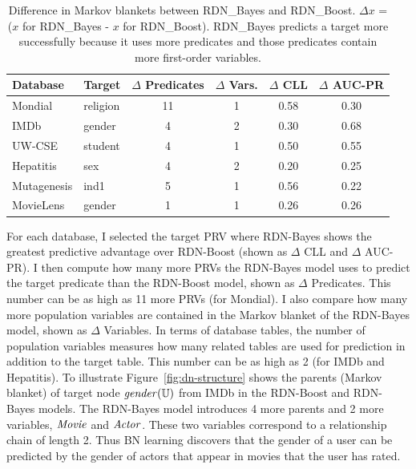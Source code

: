 \documentclass{sfuthesis}
\begin{document}
\begin{table}[!htbp]
 \addtolength{\tabcolsep}{5pt}
 \caption{Difference in Markov blankets between RDN\_Bayes and RDN\_Boost. $\Delta x$ = ($x$ for RDN\_Bayes - $x$ for RDN\_Boost).  RDN\_Bayes predicts a target more successfully because it uses more  predicates and those predicates contain more first-order variables.}
      \centering
\begin{tabular}{l l c c c c}
\hline
Database & Target & $\Delta$ Predicates  & $\Delta$ Vars. & $\Delta$ CLL & $\Delta$ AUC-PR \\\hline
Mondial & religion & 11 & 1 & 0.58 & 0.30\\
IMDb & gender & 4 & 2 & 0.30 & 0.68 \\
UW-CSE & student & 4 & 1 & 0.50 & 0.55 \\
Hepatitis & sex & 4 & 2 & 0.20 & 0.25\\
Mutagenesis & ind1 & 5 & 1 & 0.56 & 0.22 \\
MovieLens & gender & 1 & 1 & 0.26 & 0.26 \\\hline
\end{tabular}
 \label{table:mb-comparison}%
\end{table}%


For each database, I  selected the target PRV where RDN-Bayes shows the greatest predictive advantage over RDN-Boost (shown as $\Delta$ CLL and $\Delta$ AUC-PR). I  then compute how many more PRVs the RDN-Bayes model uses to predict the target predicate than the RDN-Boost model, shown as $\Delta$ Predicates. This number can be as high as 11 more PRVs (for Mondial). I  also compare how many more population variables are contained in the Markov blanket of the RDN-Bayes model, shown as $\Delta$ Variables. In terms of database tables, the number of population variables measures how many related tables are used for prediction in addition to the target table. This number can be as high as 2 (for IMDb and Hepatitis). To illustrate Figure~\ref{fig:dn-structure} shows the parents (Markov blanket) of target node $\it{gender}(\mathbb{U})$ from IMDb in the RDN-Boost and RDN-Bayes models. The RDN-Bayes model introduces 4 more parents and 2 more variables, $\it{Movie}$ and $\it{Actor}$. These two variables correspond to a relationship chain of length 2. Thus BN learning discovers that the gender of a user can be predicted by the gender of actors that appear in movies that the user has rated.
\end{document}
